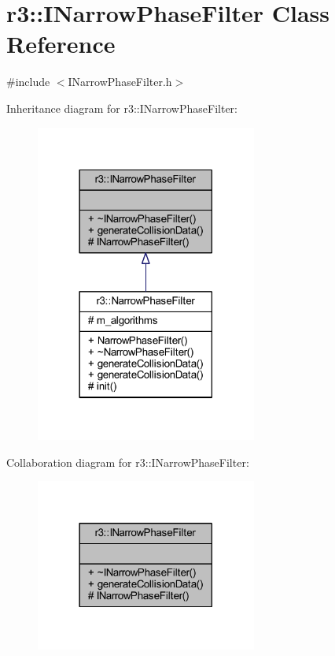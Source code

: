 \hypertarget{classr3_1_1_i_narrow_phase_filter}{}\section{r3\+:\+:I\+Narrow\+Phase\+Filter Class Reference}
\label{classr3_1_1_i_narrow_phase_filter}


{\ttfamily \#include $<$I\+Narrow\+Phase\+Filter.\+h$>$}



Inheritance diagram for r3\+:\+:I\+Narrow\+Phase\+Filter\+:\nopagebreak
\begin{figure}[H]
\begin{center}
\leavevmode
\includegraphics[width=206pt]{classr3_1_1_i_narrow_phase_filter__inherit__graph}
\end{center}
\end{figure}


Collaboration diagram for r3\+:\+:I\+Narrow\+Phase\+Filter\+:\nopagebreak
\begin{figure}[H]
\begin{center}
\leavevmode
\includegraphics[width=206pt]{classr3_1_1_i_narrow_phase_filter__coll__graph}
\end{center}
\end{figure}
